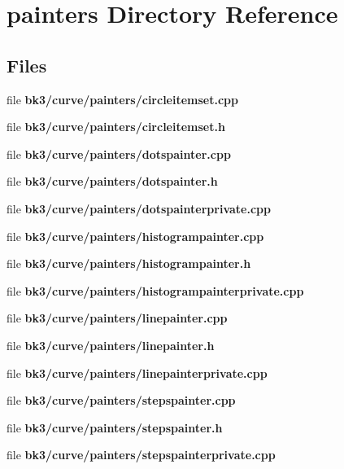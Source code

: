 \section{painters Directory Reference}
\label{dir_fea52e56b95bf90f635266309d7283ac}
\subsection*{Files}
\begin{DoxyCompactItemize}
\item 
file {\bf bk3/curve/painters/circleitemset.\+cpp}
\item 
file {\bf bk3/curve/painters/circleitemset.\+h}
\item 
file {\bf bk3/curve/painters/dotspainter.\+cpp}
\item 
file {\bf bk3/curve/painters/dotspainter.\+h}
\item 
file {\bf bk3/curve/painters/dotspainterprivate.\+cpp}
\item 
file {\bf bk3/curve/painters/histogrampainter.\+cpp}
\item 
file {\bf bk3/curve/painters/histogrampainter.\+h}
\item 
file {\bf bk3/curve/painters/histogrampainterprivate.\+cpp}
\item 
file {\bf bk3/curve/painters/linepainter.\+cpp}
\item 
file {\bf bk3/curve/painters/linepainter.\+h}
\item 
file {\bf bk3/curve/painters/linepainterprivate.\+cpp}
\item 
file {\bf bk3/curve/painters/stepspainter.\+cpp}
\item 
file {\bf bk3/curve/painters/stepspainter.\+h}
\item 
file {\bf bk3/curve/painters/stepspainterprivate.\+cpp}
\end{DoxyCompactItemize}
